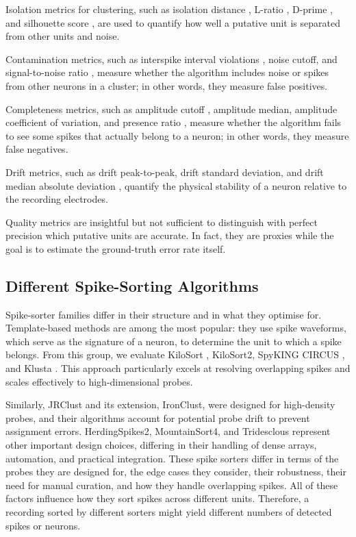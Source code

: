 Isolation metrics for clustering, such as isolation distance \parencite{Harris2001}, L-ratio \parencite{SchmitzerTorbert2005}, D-prime \parencite{Hill2011}, and silhouette score \parencite{ROUSSEEUW198753}, are used to quantify how well a putative unit is separated from other units and noise.

Contamination metrics, such as interspike interval violations \parencite{Hill2011}, noise cutoff, and signal-to-noise ratio \parencite{IBL2022}, measure whether the algorithm includes noise or spikes from other neurons in a cluster; in other words, they measure false positives.

Completeness metrics, such as amplitude cutoff \parencite{Hill2011}, amplitude median, amplitude coefficient of variation, and presence ratio \parencite{IBL2022}, measure whether the algorithm fails to see some spikes that actually belong to a neuron; in other words, they measure false negatives.

Drift metrics, such as drift peak-to-peak, drift standard deviation, and drift median absolute deviation \parencite{Siegle2021}, quantify the physical stability of a neuron relative to the recording electrodes.

Quality metrics are insightful but not sufficient to distinguish with perfect precision which putative units are accurate. In fact, they are proxies while the goal is to estimate the ground-truth error rate itself.

\subsection{Different Spike-Sorting Algorithms}

Spike-sorter families differ in their structure and in what they optimise for. Template-based methods are among the most popular: they use spike waveforms, which serve as the signature of a neuron, to determine the unit to which a spike belongs. From this group, we evaluate KiloSort \parencite{Pachitariu2016}, KiloSort2, SpyKING CIRCUS \parencite{10.7554/eLife.34518}, and Klusta \parencite{Rossant2016}. This approach particularly excels at resolving overlapping spikes and scales effectively to high-dimensional probes.

Similarly, JRClust \parencite{Jun2017} and its extension, IronClust, were designed for high-density probes, and their algorithms account for potential probe drift to prevent assignment errors. HerdingSpikes2, MountainSort4, and Tridesclous represent other important design choices, differing in their handling of dense arrays, automation, and practical integration. These spike sorters differ in terms of the probes they are designed for, the edge cases they consider, their robustness, their need for manual curation, and how they handle overlapping spikes. All of these factors influence how they sort spikes across different units. Therefore, a recording sorted by different sorters might yield different numbers of detected spikes or neurons.

